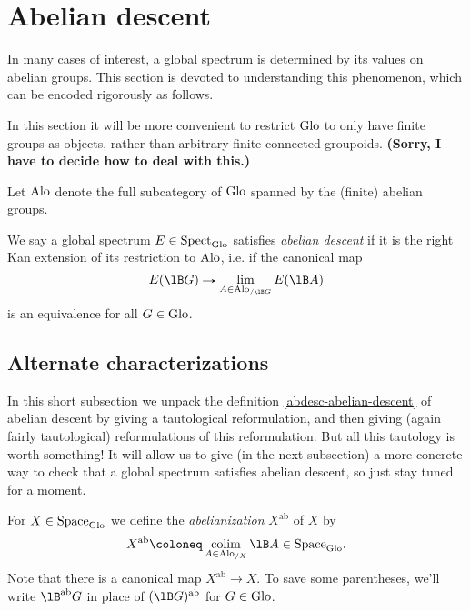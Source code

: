 \section{Abelian descent}
\label{abdesc}

In many cases of interest, a global spectrum is determined by its
values on abelian groups. This section is devoted to understanding
this phenomenon, which can be encoded rigorously as follows.

\begin{remark}
  In this section it will be more convenient to restrict $\mathrm{Glo}$ to
  only have finite groups as objects, rather than arbitrary finite
  connected groupoids. \textbf{(Sorry, I have to decide how to deal
    with this.)}
\end{remark}

\begin{notation}
  \label{abdesc-alo}
  Let $\mathrm{Alo}$ denote the full subcategory of $\mathrm{Glo}$ spanned by the
  (finite) abelian groups.
\end{notation}

\begin{definition}
  \label{abdesc-abelian-descent}
  We say a global spectrum $E \in \mathrm{Spect}_{\mathrm{Glo}}$ satisfies \emph{abelian
    descent} if it is the right Kan extension of its restriction to
  $\mathrm{Alo}$, i.e. if the canonical map
  \[
  E(\lB G) \to \lim_{A \in \Alo_{/\lB G}} E(\lB A)
  \]
  is an equivalence for all $G \in \mathrm{Glo}$.
\end{definition}

\subsection{Alternate characterizations}
\label{abdesc-alternate}

In this short subsection we unpack the definition
\cref{abdesc-abelian-descent} of abelian descent by giving a
tautological reformulation, and then giving (again fairly
tautological) reformulations of this reformulation. But all this
tautology is worth something! It will allow us to give (in the next
subsection) a more concrete way to check that a global spectrum
satisfies abelian descent, so just stay tuned for a moment.

\newcommand{\ab}{\mathrm{ab}}

\begin{definition}
  \label{abdesc-abelianization}
  For $X \in \mathrm{Space}_{\mathrm{Glo}}$ we define the \emph{abelianization} $X^\ab$
  of $X$ by
  \[
  X^\ab \ce \colim_{A \in \Alo_{/X}} \lB A \in \Space_\Glo.
  \]
  Note that there is a canonical map $X^\ab \to X$. To save some
  parentheses, we'll write $\lB^\ab G$ in place of $(\lB G)^\ab$ for
  $G \in \mathrm{Glo}$.
\end{definition}

